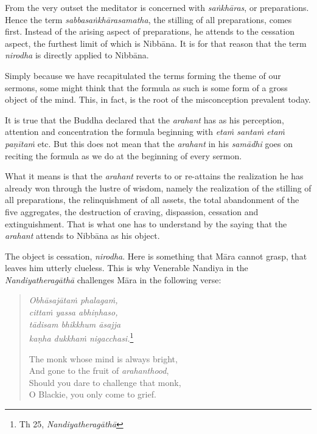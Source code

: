 From the very outset the meditator is concerned with \emph{saṅkhāras}, or preparations. Hence the term \emph{sabbasaṅkhārasamatha}, the stilling of all preparations, comes first. Instead of the arising aspect of preparations, he attends to the cessation aspect, the furthest limit of which is Nibbāna. It is for that reason that the term \emph{nirodha} is directly applied to Nibbāna.

Simply because we have recapitulated the terms forming the theme of our sermons, some might think that the formula as such is some form of a gross object of the mind. This, in fact, is the root of the misconception prevalent today.

It is true that the Buddha declared that the \emph{arahant} has as his perception, attention and concentration the formula beginning with \emph{etaṁ santaṁ etaṁ paṇītaṁ} etc. But this does not mean that the \emph{arahant} in his \emph{samādhi} goes on reciting the formula as we do at the beginning of every sermon.

What it means is that the \emph{arahant} reverts to or re-attains the realization he has already won through the lustre of wisdom, namely the realization of the stilling of all preparations, the relinquishment of all assets, the total abandonment of the five aggregates, the destruction of craving, dispassion, cessation and extinguishment. That is what one has to understand by the saying that the \emph{arahant} attends to Nibbāna as his object.

The object is cessation, \emph{nirodha}. Here is something that Māra cannot grasp, that leaves him utterly clueless. This is why Venerable Nandiya in the \emph{Nandiyatheragāthā} challenges Māra in the following verse:

\begin{quote}
\emph{Obhāsajātaṁ phalagaṁ,}\\
\emph{cittaṁ yassa abhiṇhaso,}\\
\emph{tādisam bhikkhum āsajja}\\
\emph{kaṇha dukkhaṁ nigacchasi.}\footnote{Th 25, \emph{Nandiyatheragāthā}}

\clearpage

The monk whose mind is always bright,\\
And gone to the fruit of \emph{arahanthood},\\
Should you dare to challenge that monk,\\
O Blackie, you only come to grief.
\end{quote}

